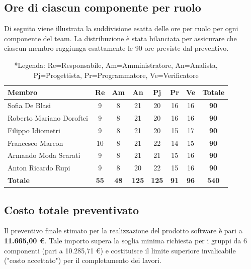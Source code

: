 \documentclass[11pt, a4paper]{article}
\begin{document}
	\subsection{Ore di ciascun componente per ruolo}
	Di seguito viene illustrata la suddivisione esatta delle ore per ruolo per ogni componente del team. La distribuzione è stata bilanciata per assicurare che ciascun membro raggiunga esattamente le 90 ore previste dal preventivo.
	
	\begin{table}[H]
		\centering
		\renewcommand{\arraystretch}{1.3}
		\begin{tabularx}{\textwidth}{|X|c|c|c|c|c|c|c|}
			\hline
			\rowcolor{primarycolor!10}
			\textbf{Membro} & \textbf{Re} & \textbf{Am} & \textbf{An} & \textbf{Pj} & \textbf{Pr} & \textbf{Ve} & \textbf{Totale} \\
			\hline
			{Sofia De Blasi} & 9 & 8 & 21 & 20 & 16 & 16 & \textbf{90} \\
			\hline
			{Roberto Mariano Doroftei} & 9 & 8 & 21 & 20 & 16 & 16 & \textbf{90} \\
			\hline
			{Filippo Idiometri} & 9 & 8 & 21 & 20 & 15 & 17 & \textbf{90} \\
			\hline
			{Francesco Marcon} & 10 & 8 & 21 & 22 & 14 & 15 & \textbf{90} \\
			\hline
			{Armando Moda Scarati} & 9 & 8 & 21 & 21 & 15 & 16 & \textbf{90} \\
			\hline
			{Anton Ricardo Rupi} & 9 & 8 & 20 & 22 & 15 & 16 & \textbf{90} \\
			\hline
			\rowcolor{lightgray}
			\textbf{Totale} & \textbf{55} & \textbf{48} & \textbf{125} & \textbf{125} & \textbf{91} & \textbf{96} & \textbf{540} \\
			\hline
		\end{tabularx}
		\caption*{*Legenda: Re=Responsabile, Am=Amministratore, An=Analista, Pj=Progettista, Pr=Programmatore, Ve=Verificatore}
	\end{table}
	
	\subsection{Costo totale preventivato}
	Il preventivo finale stimato per la realizzazione del prodotto software è pari a \textbf{11.665,00 \euro}. Tale importo supera la soglia minima richiesta per i gruppi da 6 componenti (pari a 10.285,71 \euro) e costituisce il limite superiore invalicabile ("costo accettato") per il completamento dei lavori.
	
\end{document}
